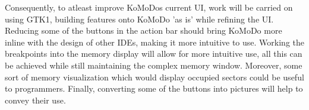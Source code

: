     Consequently, to atleast improve KoMoDos current UI, work will be carried on using GTK1, building features onto KoMoDo 'as is' while refining the UI. Reducing some of the buttons in the action bar should bring KoMoDo more inline with the design of other IDEs, making it more intuitive to use. Working the breakpoints into the memory display will allow for more intuitive use, all this can be achieved while still maintaining the complex memory window. Moreover, some sort of memory visualization which would display occupied sectors could be useful to programmers. Finally, converting some of the buttons into pictures will help to convey their use.

